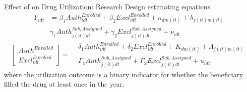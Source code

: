 \begin{frame}{Effect of on Drug Utilization: Research Design}
    estimating equations
    \begin{equation}
    \begin{aligned}
        Y_{idt} & =\beta_1Auth^{Enrolled}_{idt}+\beta_2 Excl^{Enrolled}_{idt}+\kappa_{dm(it)}+\lambda_{j(it)m(it)} \\
        &\gamma_1 Auth^{Sub,Assigned}_{j(it)dt} + \gamma_2 Excl^{Sub,Assigned}_{j(it)dt} + \nu_{idt}
    \end{aligned}
    \end{equation}
    \begin{equation}
        \begin{bmatrix}
    Auth^{Enrolled} \\
    Excl^{Enrolled}_{idt}
        \end{bmatrix}
        =
        \begin{aligned}
         & \delta_1Auth^{Enrolled}_{idt}+\delta_2 Excl^{Enrolled}_{idt}+K_{dm(it)}+\Lambda_{j(it)m(it)} \\
        &\Gamma_1 Auth^{Sub,Assigned}_{j(it)dt} + \Gamma_2 Excl^{Sub,Assigned}_{j(it)dt} + u_{idt}
        \end{aligned}
    \end{equation}
     $$$$
     where the utilization outcome is a binary indicator for whether the beneficiary filled the drug at least once in the year.
\end{frame}